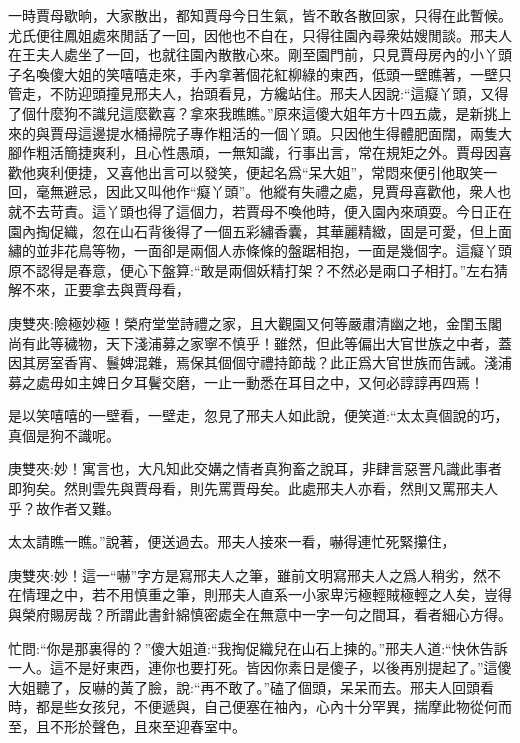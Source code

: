 \begin{parag}
    一時賈母歇晌，大家散出，都知賈母今日生氣，皆不敢各散回家，只得在此暫候。尤氏便往鳳姐處來閒話了一回，因他也不自在，只得往園內尋衆姑嫂閒談。邢夫人在王夫人處坐了一回，也就往園內散散心來。剛至園門前，只見賈母房內的小丫頭子名喚傻大姐的笑嘻嘻走來，手內拿著個花紅柳綠的東西，低頭一壁瞧著，一壁只管走，不防迎頭撞見邢夫人，抬頭看見，方纔站住。邢夫人因說:“這癡丫頭，又得了個什麼狗不識兒這麼歡喜？拿來我瞧瞧。”原來這傻大姐年方十四五歲，是新挑上來的與賈母這邊提水桶掃院子專作粗活的一個丫頭。只因他生得體肥面闊，兩隻大腳作粗活簡捷爽利，且心性愚頑，一無知識，行事出言，常在規矩之外。賈母因喜歡他爽利便捷，又喜他出言可以發笑，便起名爲“呆大姐”，常悶來便引他取笑一回，毫無避忌，因此又叫他作“癡丫頭”。他縱有失禮之處，見賈母喜歡他，衆人也就不去苛責。這丫頭也得了這個力，若賈母不喚他時，便入園內來頑耍。今日正在園內掏促織，忽在山石背後得了一個五彩繡香囊，其華麗精緻，固是可愛，但上面繡的並非花鳥等物，一面卻是兩個人赤條條的盤踞相抱，一面是幾個字。這癡丫頭原不認得是春意，便心下盤算:“敢是兩個妖精打架？不然必是兩口子相打。”左右猜解不來，正要拿去與賈母看，\begin{note}庚雙夾:險極妙極！榮府堂堂詩禮之家，且大觀園又何等嚴肅清幽之地，金閨玉閣尚有此等穢物，天下淺浦募之家寧不慎乎！雖然，但此等偏出大官世族之中者，蓋因其房室香宵、鬟婢混雜，焉保其個個守禮持節哉？此正爲大官世族而告誡。淺浦募之處毋如主婢日夕耳鬢交磨，一止一動悉在耳目之中，又何必諄諄再四焉！\end{note}是以笑嘻嘻的一壁看，一壁走，忽見了邢夫人如此說，便笑道:“太太真個說的巧，真個是狗不識呢。\begin{note}庚雙夾:妙！寓言也，大凡知此交媾之情者真狗畜之說耳，非肆言惡詈凡識此事者即狗矣。然則雲先與賈母看，則先罵賈母矣。此處邢夫人亦看，然則又罵邢夫人乎？故作者又難。\end{note}太太請瞧一瞧。”說著，便送過去。邢夫人接來一看，嚇得連忙死緊攥住，\begin{note}庚雙夾:妙！這一“嚇”字方是寫邢夫人之筆，雖前文明寫邢夫人之爲人稍劣，然不在情理之中，若不用慎重之筆，則邢夫人直系一小家卑污極輕賊極輕之人矣，豈得與榮府賜房哉？所謂此書針綿慎密處全在無意中一字一句之間耳，看者細心方得。\end{note}忙問:“你是那裏得的？”傻大姐道:“我掏促織兒在山石上揀的。”邢夫人道:“快休告訴一人。這不是好東西，連你也要打死。皆因你素日是傻子，以後再別提起了。”這傻大姐聽了，反嚇的黃了臉，說:“再不敢了。”磕了個頭，呆呆而去。邢夫人回頭看時，都是些女孩兒，不便遞與，自己便塞在袖內，心內十分罕異，揣摩此物從何而至，且不形於聲色，且來至迎春室中。
\end{parag}


